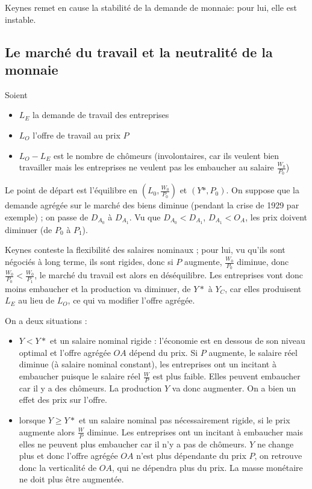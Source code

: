 	Keynes remet en cause la stabilité de la demande de monnaie:  pour lui, elle est instable.
	
	\subsection{Le marché du travail et la neutralité de la monnaie}
	
	
	
	
	Soient
	
	\begin{itemize}
		\item $L_E$ la demande de travail des entreprises
		\item $L_O$ l'offre de travail au prix $P$
		\item $L_O - L_E$ est le nombre de chômeurs (involontaires, car ils veulent bien travailler mais les entreprises ne veulent pas les embaucher au salaire $\frac{W_0}{P_0}$)
	\end{itemize}
	
	Le point de départ est l'équilibre en $(L_0, \frac{W_0}{P_0})$ et $(Y*, P_0)$. On suppose que la demande agrégée sur le marché des biens diminue (pendant la crise de 1929 par exemple) ; on passe de $D_{A_0}$ à $D_{A_1}$.  Vu que $D_{A_0} < D_{A_1}$, $D_{A_1} < O_A$, les prix doivent diminuer (de $P_0$ à $P_1$).
	
	Keynes conteste la flexibilité des salaires nominaux ; pour lui, vu qu'ils sont négociés à long terme, ils sont rigides, donc si $P$ augmente, $\frac{W_0}{P_0}$ diminue, donc $\frac{W_0}{P_0} <\frac{W_0}{P_1}$, le marché du travail est alors en déséquilibre. Les entreprises vont donc moins embaucher et la production va diminuer, de $Y*$ à $Y_C$, car elles produisent $L_E$ au lieu de $L_O$, ce qui va modifier l'offre agrégée.
	
	On a deux situations :
	
	\begin{itemize}
		\item $Y < Y*$ et un salaire nominal rigide : l'économie est en dessous de son niveau optimal et l'offre agrégée $OA$ dépend du prix. Si $P$ augmente, le salaire réel diminue (à salaire nominal constant), les entreprises ont un incitant à embaucher puisque le salaire réel $\frac{W}{P}$ est plus faible. Elles peuvent embaucher car il y a des chômeurs. La production $Y$ va donc augmenter. On a bien un effet des prix sur l'offre.
		
		\item lorsque $Y \geq Y*$ et un salaire nominal pas nécessairement rigide, si le prix augmente alors $\frac{W}{P}$ diminue. Les entreprises ont un incitant à embaucher mais elles ne peuvent plus embaucher car il n'y a pas de chômeurs. $Y$ ne change plus et donc l'offre agrégée $OA$ n'est plus dépendante du prix $P$, on retrouve donc la verticalité de $OA$, qui ne dépendra plus du prix. La masse monétaire ne doit plus être augmentée.
	\end{itemize}
	
